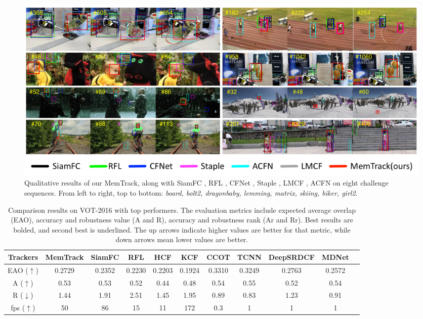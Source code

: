 \documentclass[runningheads]{llncs}
\begin{document}
\begin{figure}[t]
	\begin{center}
		\includegraphics[width=0.95\linewidth]{figs/qualitative.jpg}
	\end{center}
	\caption{Qualitative results of our MemTrack, along with  SiamFC \cite{Bertinetto2016}, RFL \cite{Yang2017}, CFNet \cite{Valmadre2017},  Staple \cite{Bertinetto2016-1}, LMCF \cite{Wang2017}, ACFN \cite{Choi2017} on eight challenge sequences. From left to right, top to bottom: \textit{board, bolt2, dragonbaby, lemming, matrix, skiing, biker, girl2}.}
	\label{fig:12}
\end{figure}

\begin{table}
	\small
	\begin{center}
		\begin{tabular}{cccccc|ccccc}
			\hline 
			Trackers & MemTrack & SiamFC & RFL & HCF& KCF & CCOT &TCNN & DeepSRDCF & MDNet \\
			\hline
			EAO ($\uparrow$) & 0.2729 & 0.2352 & 0.2230 &0.2203 & 0.1924&  0.3310 & 0.3249 & 0.2763 &0.2572\\
			A ($\uparrow$) & 0.53 & 0.53  &0.52 &0.44 & 0.48 &  0.54 & 0.55 &0.52  & 0.54\\
			R ($\downarrow$) & 1.44 & 1.91 &2.51 &1.45 &1.95 &  0.89 & 0.83 & 1.23 & 0.91\\
			fps ($\uparrow$) & 50 & 86 & 15& 11& 172&  0.3 & 1 & 1 & 1 \\
			\hline
		\end{tabular} 
	\end{center}
	\caption{Comparison results on VOT-2016 with top performers. The evaluation metrics include expected average overlap (EAO), accuracy and robustness value (A and R), accuracy and robustness rank (Ar and Rr). Best results are bolded, and second best is underlined. The up arrows indicate higher values are better for that metric, while down arrows mean lower values are better.}
	\label{tb:2}
\end{table}
	
\end{document}
